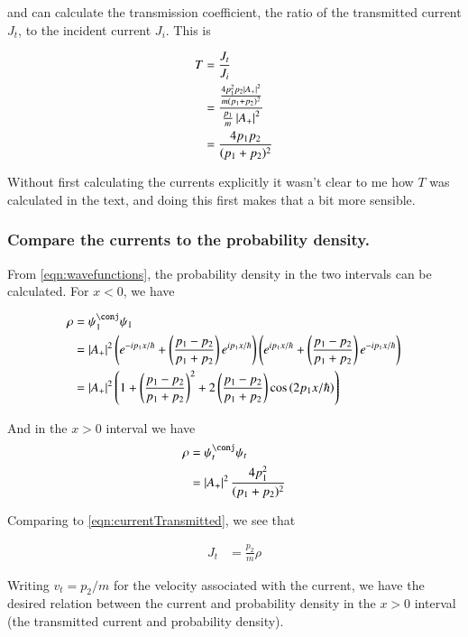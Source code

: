 \documentclass{article}
\begin{document}
and can calculate the transmission coefficient, the ratio of the transmitted current $J_t$, to the incident current $J_i$.  This is

\begin{align*}
T 
&= \frac{J_t}{J_i} \\
&= 
\frac{
\frac{ 4 p_1^2 p_2 \left\lvert{ A_{+} }\right\rvert^2}{m (p_1 + p_2)^2}
}
{
\frac{ p_1}{m} \left\lvert{ A_{+} }\right\rvert^2 
} \\
&=
\frac{ 4 p_1 p_2 }{ (p_1 + p_2)^2}
\end{align*}

Without first calculating the currents explicitly it wasn't clear to me how $T$ was calculated in the text, and doing this first
makes that a bit more sensible.

\subsubsection{ Compare the currents to the probability density. }

From \ref{eqn:wavefunctions}, the probability density in the two intervals
can be calculated.  For $x<0$, we have

\begin{align*}
\rho 
&= \psi_1^\conj \psi_1 \\
&= 
\Abs{ A_{+} }^2
\left(
e^{ -i p_1 x/\hbar }
+\left( \frac{ p_1 - p_2 }{p_1 + p_2} \right) e^{ i p_1 x/\hbar } 
\right)
\left(
e^{ i p_1 x/\hbar }
+\left( \frac{ p_1 - p_2 }{p_1 + p_2} \right) e^{ -i p_1 x/\hbar } 
\right)
\\
&=
\Abs{ A_{+} }^2
\left(
1 
+ 
\left( \frac{ p_1 - p_2 }{p_1 + p_2} \right)^2
+ 
2 \left( \frac{ p_1 - p_2 }{p_1 + p_2} \right) \cos\left(
2 p_1 x/\hbar
\right)
\right)
\end{align*}

And in the $x>0$ interval we have
\begin{align*}
\rho 
&= \psi_t^\conj \psi_t \\
&=
\Abs{A_{+}}^2 \frac{4 p_1^2 }{(p_1 + p_2)^2} 
\end{align*}

Comparing to \ref{eqn:currentTransmitted}, we see that 

\begin{align*}
J_t &= \frac{ p_2 }{ m } \rho
\end{align*}

Writing $v_t = p_2/m$ for the velocity associated with the current, we have 
the desired relation between the current and probability density in the $x>0$ interval (the transmitted current and probability density).
\end{document}
